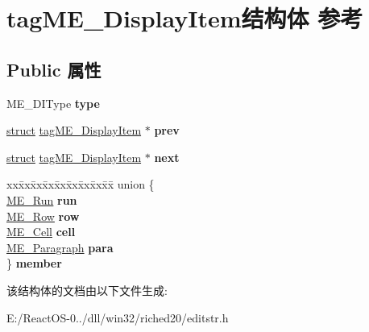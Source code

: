 \hypertarget{structtag_m_e___display_item}{}\section{tag\+M\+E\+\_\+\+Display\+Item结构体 参考}
\label{structtag_m_e___display_item}
\subsection*{Public 属性}
\begin{DoxyCompactItemize}
\item 
\mbox{\label{structtag_m_e___display_item_aae9c594c0a9b34b2799a4a911b4bf4de}} 
M\+E\+\_\+\+D\+I\+Type {\bfseries type}
\item 
\mbox{\label{structtag_m_e___display_item_acf5644d865c10d3128f9d38e7b6c7cc2}} 
\hyperlink{interfacestruct}{struct} \hyperlink{structtag_m_e___display_item}{tag\+M\+E\+\_\+\+Display\+Item} $\ast$ {\bfseries prev}
\item 
\mbox{\label{structtag_m_e___display_item_af3d50d64542f02081137aaa35a189169}} 
\hyperlink{interfacestruct}{struct} \hyperlink{structtag_m_e___display_item}{tag\+M\+E\+\_\+\+Display\+Item} $\ast$ {\bfseries next}
\item 
\mbox{\label{structtag_m_e___display_item_ac6b2e44f9272e07a42238d51a63c5564}} 
\begin{tabbing}
xx\=xx\=xx\=xx\=xx\=xx\=xx\=xx\=xx\=\kill
union \{\\
\>\hyperlink{structtag_m_e___run}{ME\_Run} {\bfseries run}\\
\>\hyperlink{structtag_m_e___row}{ME\_Row} {\bfseries row}\\
\>\hyperlink{structtag_m_e___cell}{ME\_Cell} {\bfseries cell}\\
\>\hyperlink{structtag_m_e___paragraph}{ME\_Paragraph} {\bfseries para}\\
\} {\bfseries member}\\

\end{tabbing}\end{DoxyCompactItemize}


该结构体的文档由以下文件生成\+:\begin{DoxyCompactItemize}
\item 
E\+:/\+React\+O\+S-\/0../dll/win32/riched20/editstr.\+h\end{DoxyCompactItemize}
